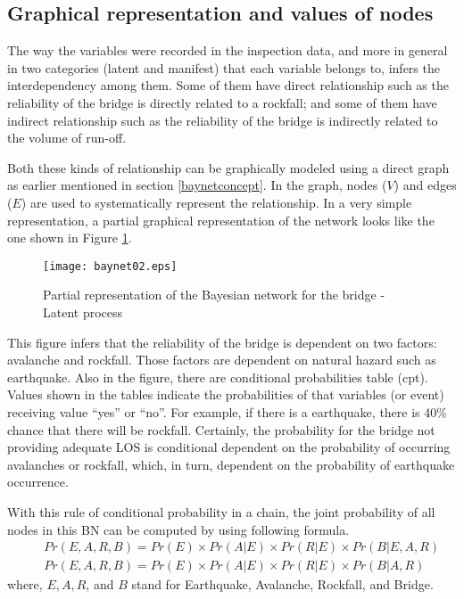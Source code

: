 \subsection{Graphical representation and values of nodes}
The way the variables were recorded in the inspection data, and more in general in two categories (latent and manifest) that each variable belongs to, infers the interdependency among them. Some of them have direct relationship such as the reliability of the bridge is directly related to a rockfall; and some of them have indirect relationship such as the reliability of the bridge is indirectly related to the volume of run-off. 

Both these kinds of relationship can be graphically modeled using a direct graph as earlier mentioned in section \ref{baynetconcept}. In the graph, nodes ($V$) and edges ($E$) are used to systematically represent the relationship. 
In a very simple representation, a partial graphical representation of the network looks like the one shown in Figure \ref{baynet02}. 

\begin{figure}[h]
\begin{center}
\texttt{[image: baynet02.eps]}
\caption{Partial representation of the Bayesian network for the bridge - Latent process}\label{baynet02}
\end{center}
\end{figure}

This figure infers that the reliability of the bridge is dependent on two factors: avalanche and rockfall. Those factors are dependent on natural hazard such as earthquake. Also in the figure, there are conditional probabilities table (cpt). Values shown in the tables indicate the probabilities of that variables (or event) receiving value ``yes'' or ``no''. For example, if there is a earthquake, there is 40\% chance that there will be rockfall. Certainly, the probability for the bridge not providing adequate LOS is conditional dependent on the probability of occurring avalanches or rockfall, which, in turn, dependent on the probability of earthquake occurrence. 

With this rule of conditional probability in a chain, the joint probability of all nodes in this BN can be computed by using following formula.
%
\begin{eqnarray}
 && Pr(E,A,R,B)=Pr(E)\times Pr(A|E)\times Pr(R|E)\times Pr(B|E,A,R)   \label{baynetformula1}\\
 && Pr(E,A,R,B)=Pr(E)\times Pr(A|E)\times Pr(R|E)\times Pr(B|A,R)   \label{baynetformula2}
\end{eqnarray}
where, $E,A,R$, and $B$ stand for Earthquake, Avalanche, Rockfall, and Bridge. 

